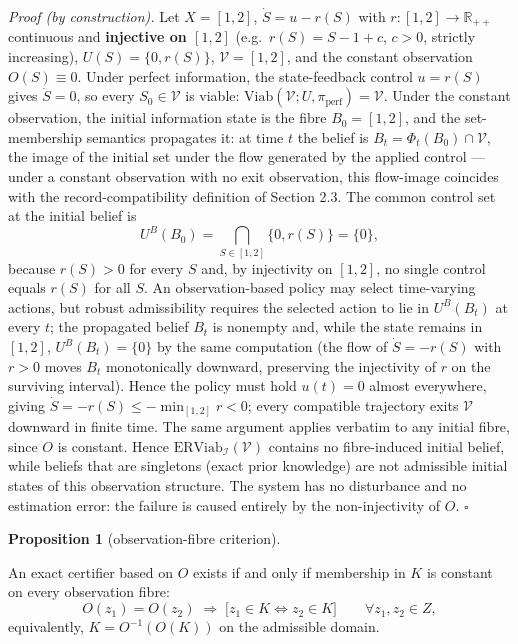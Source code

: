 \documentclass[11pt]{article}
\theoremstyle{definition}
\newtheorem{proposition}{Proposition}
\begin{document}
\emph{Proof (by construction).} Let \(X = [1,2]\), \(\dot S = u - r(S)\)
with \(r : [1,2] \to \mathbb{R}_{++}\) continuous and \textbf{injective
on \([1,2]\)} (e.g.~\(r(S) = S - 1 + c\), \(c > 0\), strictly
increasing), \(U(S) = \{0, r(S)\}\), \(\mathcal{V} = [1,2]\), and the
constant observation \(O(S) \equiv 0\). Under perfect information, the
state-feedback control \(u = r(S)\) gives \(\dot S = 0\), so every
\(S_0 \in \mathcal{V}\) is viable:
\(\mathrm{Viab}(\mathcal{V}; U, \pi_{\mathrm{perf}}) = \mathcal{V}\).
Under the constant observation, the initial information state is the
fibre \(B_0 = [1,2]\), and the set-membership semantics propagates it:
at time \(t\) the belief is \(B_t = \Phi_t(B_0) \cap \mathcal{V}\), the
image of the initial set under the flow generated by the applied control
--- under a constant observation with no exit observation, this
flow-image coincides with the record-compatibility definition of Section
2.3. The common control set at the initial belief is
\[U^B(B_0) = \bigcap_{S \in [1,2]} \{0, r(S)\} = \{0\},\] because
\(r(S) > 0\) for every \(S\) and, by injectivity on \([1,2]\), no single
control equals \(r(S)\) for all \(S\). An observation-based policy may
select time-varying actions, but robust admissibility requires the
selected action to lie in \(U^B(B_t)\) at every \(t\); the propagated
belief \(B_t\) is nonempty and, while the state remains in \([1,2]\),
\(U^B(B_t) = \{0\}\) by the same computation (the flow of
\(\dot S = -r(S)\) with \(r > 0\) moves \(B_t\) monotonically downward,
preserving the injectivity of \(r\) on the surviving interval). Hence
the policy must hold \(u(t) = 0\) almost everywhere, giving
\(\dot S = -r(S) \le -\min_{[1,2]} r < 0\); every compatible trajectory
exits \(\mathcal{V}\) downward in finite time. The same argument applies
verbatim to any initial fibre, since \(O\) is constant. Hence
\(\mathrm{ERViab}_{\mathcal{I}}(\mathcal{V})\) contains no fibre-induced
initial belief, while beliefs that are singletons (exact prior
knowledge) are not admissible initial states of this observation
structure. The system has no disturbance and no estimation error: the
failure is caused entirely by the non-injectivity of \(O\). \ensuremath{\square}

\begin{proposition}[observation-fibre criterion]\label{prop:fibre}

An exact certifier
based on \(O\) exists if and only if membership in \(K\) is constant on
every observation fibre:
\[O(z_1) = O(z_2) \;\Longrightarrow\; \big[ z_1 \in K \iff z_2 \in K \big] \qquad \forall z_1, z_2 \in Z, \tag{5}\]
equivalently, \(K = O^{-1}(O(K))\) on the admissible domain.

\end{proposition}
\end{document}

